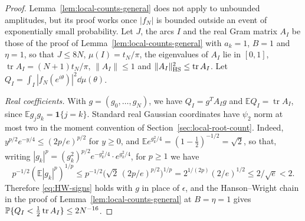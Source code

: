 \begin{proof}
Lemma~\ref{lem:local-counts-general} does not apply to unbounded
amplitudes, but its proof works once $|f_N|$ is bounded outside an event
of exponentially small probability.
Let $J$, the arcs $I$ and the real Gram matrix $A_I$ be those of the
proof of Lemma~\ref{lem:local-counts-general} with $a_k=1$, $B=1$ and
$\eta=1$, so that $J\le8N$,
$\mu(I)=t_N/\pi$, the eigenvalues of $A_I$ lie in $[0,1]$,
$\operatorname{tr}A_I=(N+1)t_N/\pi$, $\|A_I\|\le1$ and
$\|A_I\|_{\rm HS}^2\le\operatorname{tr}A_I$.
Let $Q_I=\int_I|f_N(e^{i\theta})|^2\dd\mu(\theta)$.

\emph{Real coefficients.}
With $g=(g_0,\dots,g_N)$, we have $Q_I=g^TA_Ig$ and
$\mathbb EQ_I=\operatorname{tr}A_I$, since
$\mathbb Eg_jg_k=\mathbf 1\{j=k\}$.
Standard real Gaussian coordinates have $\psi_2$ norm at most two in the
moment convention of Section~\ref{sec:local-root-count}.
Indeed, $y^{p/2}e^{-y/4}\le(2p/e)^{p/2}$ for $y\ge0$, and
$\mathbb Ee^{g_k^2/4}=(1-\tfrac12)^{-1/2}=\sqrt2$, so that, writing
$|g_k|^p=(g_k^2)^{p/2}e^{-g_k^2/4}\cdot e^{g_k^2/4}$, for $p\ge1$ we have
\[
 p^{-1/2}(\mathbb E|g_k|^p)^{1/p}
 \le p^{-1/2}\bigl(\sqrt2\,(2p/e)^{p/2}\bigr)^{1/p}
 =2^{1/(2p)}(2/e)^{1/2}
 \le2/\sqrt e<2.
\]
Therefore \eqref{eq:HW-signs} holds with $g$ in place of $\epsilon$, and
the Hanson--Wright chain in the proof of
Lemma~\ref{lem:local-counts-general} at $B=\eta=1$ gives
$\mathbb P\{Q_I<\tfrac12\operatorname{tr}A_I\}\le2N^{-16}$.


\end{proof}
